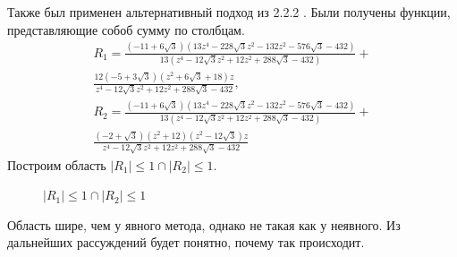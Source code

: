 \documentclass[a4paper,article,14pt]{extarticle}
\begin{document}
Также был применен альтернативный подход из 2.2.2 \cite{stabilbity}.
Были получены функции, представляющие собоб сумму по столбцам.
\begin{equation}
\begin{gathered}
R_{1} = \frac{(-11 + 6\sqrt{3})(13 z^{4} - 228\sqrt{3} z^{2} - 132 z^{2} - 576 \sqrt{3} - 432)}{13 (z^{4} - 12 \sqrt{3} z^{2} + 12 z^{2} + 288\sqrt{3} - 432)} + \\ \frac{12 (-5 + 3\sqrt{3}) (z^{2} + 6\sqrt{3} + 18) z}{z^{4} - 12\sqrt{3} z^{2} + 12 z^{2} + 288\sqrt{3} - 432}, \\
R_{2} = \frac{(-11 + 6\sqrt{3}) (13 z^{4} - 228\sqrt{3} z^{2} - 132 z^{2} - 576\sqrt{3} - 432)}{13 (z^{4} - 12\sqrt{3} z^{2} + 12 z^{2} + 288\sqrt{3} - 432)} + \\ \frac{(-2 + \sqrt{3}) (z^{2} + 12) (z^{2} - 12\sqrt{3}) z}{z^{4} - 12\sqrt{3} z^{2} + 12 z^{2} + 288\sqrt{3} - 432}
\end{gathered}
\end{equation}
Построим область $\lvert R_{1} \rvert \leq 1 \cap \lvert R_{2} \rvert \leq 1$.

\begin{figure}[ht]
\begin{center}
\caption{
\label{stab_area_another}
     $\lvert R_{1} \rvert \leq 1 \cap \lvert R_{2} \rvert \leq 1$}
\end{center}
\end{figure}

Область шире, чем у явного метода, однако не такая как у неявного. Из дальнейших рассуждений будет понятно, почему так происходит. 
\pagebreak
\end{document}
